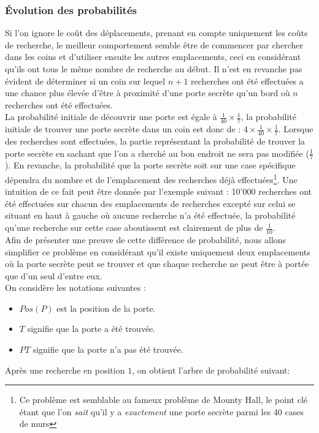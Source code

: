\documentclass[a4paper,12pt]{article}
\begin{document}
\subsubsection{Évolution des probabilités}
Si l'on ignore le coût des déplacements, prenant en compte uniquement les coûts
de recherche, le meilleur comportement semble être de commencer par chercher
dans les coins et d'utiliser ensuite les autres emplacements, ceci en
considérant qu'ils ont tous le même nombre de recherche au début. Il n'est en
revanche pas évident de déterminer si un coin sur lequel $n+1$ recherches ont
été effectuées a une chance plus élevée d'être à proximité d'une porte secrète
qu'un bord où $n$ recherches ont été effectuées.
\\
La probabilité initiale de découvrir une porte est égale à 
$\frac{1}{40} \times \frac{1}{7}$, la probabilité initiale de trouver une porte
secrète dans un coin est donc de : $4 \times \frac{1}{40} \times \frac{1}{7}$.
Lorsque des recherches sont effectuées, la partie représentant la probabilité de
trouver la porte secrète en sachant que l'on a cherché au bon endroit ne sera
pas modifiée ($\frac{1}{7}$). En revanche, la probabilité que la porte secrète
soit sur une case spécifique dépendra du nombre et de l'emplacement des
recherches déjà effectuées\footnote{Ce problème est semblable au fameux
problème de Mounty Hall, le point clé étant que l'on {\em sait} qu'il y a 
{\em exactement} une porte secrète parmi les 40 cases de murs}. Une intuition de
ce fait peut être donnée par l'exemple suivant : 10'000 recherches ont été
effectuées sur chacun des emplacements de recherches excepté sur celui se
situant en haut à gauche où aucune recherche n'a été effectuée, la probabilité
qu'une recherche sur cette case aboutissent est clairement de plus de 
$\frac{1}{10}$.
\\
Afin de présenter une preuve de cette différence de probabilité, nous allons
simplifier ce problème en considérant qu'il existe uniquement deux emplacements
où la porte secrète peut se trouver et que chaque recherche ne peut être à
portée que d'un seul d'entre eux.\\
On considère les notations suivantes :
\begin{itemize}
\item $Pos(P)$ est la position de la porte.
\item $T$ signifie que la porte a été trouvée.
\item $PT$ signifie que la porte n'a pas été trouvée.
\end{itemize}
Après une recherche en position $1$, on obtient l'arbre de probabilité suivant:
\end{document}
